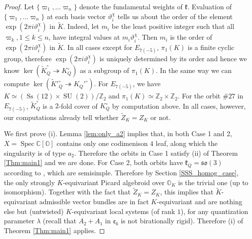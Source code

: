 \documentclass[12pt]{amsart}
\newcommand{\C}{\mathbb{C}}
\newcommand{\Orb}{\mathbb{O}}
\newcommand{\Z}{\mathbb{Z}}
\newcommand{\kf}{\mathfrak{k}}
\newcommand{\SU}{\operatorname{SU}}
\newcommand{\spec}{\operatorname{Spec}}
\theoremstyle{definition}
\numberwithin{equation}{section}
\begin{document}
\begin{proof}
	Let $\{ \varpi_1, \ldots \varpi_n \}$ denote the fundamental weights of $\kf$. Evaluation of $\{ \varpi_1, \ldots \varpi_n \}$ at each basis vector $\vartheta^{\chi}_i$ tells us about the order of the element $\exp(2\pi i \vartheta^{\chi}_i)$ in $\tilde{K}$. Indeed, let $m_i$ be the least positive integer such that all $\varpi_k, 1 \leq k \leq n$, have integral values at $m_i \vartheta^{\chi}_i$. Then $m_i$ is the order of $\exp(2\pi i \vartheta^{\chi}_i)$ in $\tilde{K}$.  In all cases except for $E_{7(-5)}$, $\pi_1(K)$ is a finite cyclic group, therefore $\exp(2\pi i \vartheta^{\chi}_i)$ is uniquely determined by its order and hence we know $\ker(\tilde{K}_Q^\circ \twoheadrightarrow K_Q^\circ)$ as a subgroup of $\pi_1(K)$. In the same way we can compute $\ker(\tilde{K}'^\circ_Q \twoheadrightarrow K_Q'^\circ)$. For $E_{7(-5)}$, we have $K \simeq (\operatorname{Ss}(12) \times \SU(2))/\Z_2$ and $\pi_1(K) \simeq \Z_2 \times \Z_2$. For the orbit $\#27$ in $E_{7(-5)}$, $\tilde{K}_Q^\circ$ is a $2$-fold cover of $K_Q^\circ$ by computation above.  In all cases, however, our computations already tell whether $\tilde{Z}_K = Z_K$ or not. 
	
	We first prove (i). Lemma \ref{lem:only_a2} implies that, in both Case 1 and 2, $X=\spec \C[\Orb]$ contains only one codimenison $4$ leaf, along which the singularity is of type $a_2$. Therefore the orbits in Case 1 satisfy (ii) of Theorem \ref{Thm:main1} and we are done.  For Case 2,  both orbits have $\kf_Q=\mathfrak{so}(3)$ according to \cite{Dk0.5}, which are semisimple. Therefore by Section \ref{SSS_homog_case}, the only strongly $K$-equivariant Picard algebroid over $\Orb_K$ is the trivial one (up to isomorphism). Together with the fact that $\tilde{Z}_K = Z_K$, this implies that $\tilde{K}$-equivariant admissible vector bundles are in fact $K$-equivariant and are nothing else but (untwisted) $K$-equivariant local systems (of rank $1$), for any quantization parameter $\lambda$ (recall that $A_2+A_1$ in $\mathfrak{e}_6$ is not birationally rigid). Therefore (i) of Theorem \ref{Thm:main1} applies.
	
	

\end{proof}
\end{document}

